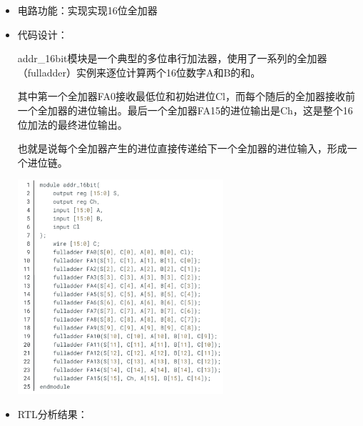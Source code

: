 \documentclass[a4,10pt,zihao=-4]{ctexart}
\begin{document}
\begin{itemize}
\item
  电路功能：实现实现16位全加器
\item
  代码设计：
    
\qquad addr\_16bit模块是一个典型的多位串行加法器，使用了一系列的全加器（fulladder）实例来逐位计算两个16位数字A和B的和。

\qquad 其中第一个全加器FA0接收最低位和初始进位Cl，而每个随后的全加器接收前一个全加器的进位输出。最后一个全加器FA15的进位输出是Ch，这是整个16位加法的最终进位输出。

\qquad 也就是说每个全加器产生的进位直接传递给下一个全加器的进位输入，形成一个进位链。
  
  \includegraphics[width=0.6\textwidth]{16bitadder_Code.png}
\item

  RTL分析结果：
  

\end{itemize}
\end{document}
